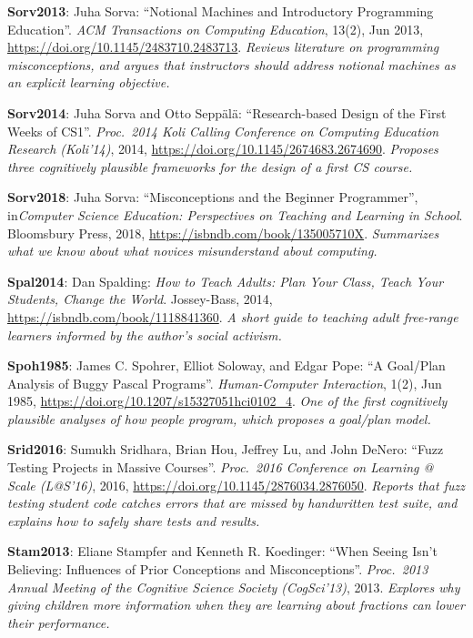 \textbf{\hypertarget{b:Sorv2013}{Sorv2013}\label{b:Sorv2013}}: Juha Sorva: ``Notional Machines and Introductory Programming Education''. \emph{ACM Transactions on Computing Education}, 13(2), Jun 2013, \url{https://doi.org/10.1145/2483710.2483713}. \emph{Reviews literature on programming misconceptions, and argues that instructors should address notional machines as an explicit learning objective.}

\textbf{\hypertarget{b:Sorv2014}{Sorv2014}\label{b:Sorv2014}}: Juha Sorva and Otto Seppälä: ``Research-based Design of the First Weeks of CS1''. \emph{Proc.\ 2014 Koli Calling Conference on Computing Education Research (Koli'14)}, 2014, \url{https://doi.org/10.1145/2674683.2674690}. \emph{Proposes three cognitively plausible frameworks for the design of a first CS course.}

\textbf{\hypertarget{b:Sorv2018}{Sorv2018}\label{b:Sorv2018}}: Juha Sorva: ``Misconceptions and the Beginner Programmer'', in\emph{Computer Science Education: Perspectives on Teaching and Learning in School}. Bloomsbury Press, 2018, \url{https://isbndb.com/book/135005710X}. \emph{Summarizes what we know about what novices misunderstand about computing.}

\textbf{\hypertarget{b:Spal2014}{Spal2014}\label{b:Spal2014}}: Dan Spalding: \emph{How to Teach Adults: Plan Your Class, Teach Your Students, Change the World}. Jossey-Bass, 2014, \url{https://isbndb.com/book/1118841360}. \emph{A short guide to teaching adult free-range learners informed by the author's social activism.}

\textbf{\hypertarget{b:Spoh1985}{Spoh1985}\label{b:Spoh1985}}: James C. Spohrer, Elliot Soloway, and Edgar Pope: ``A Goal/Plan Analysis of Buggy Pascal Programs''. \emph{Human-Computer Interaction}, 1(2), Jun 1985, \url{https://doi.org/10.1207/s15327051hci0102_4}. \emph{One of the first cognitively plausible analyses of how people program, which proposes a goal/plan model.}

\textbf{\hypertarget{b:Srid2016}{Srid2016}\label{b:Srid2016}}: Sumukh Sridhara, Brian Hou, Jeffrey Lu, and John DeNero: ``Fuzz Testing Projects in Massive Courses''. \emph{Proc.\ 2016 Conference on Learning @ Scale (L@S'16)}, 2016, \url{https://doi.org/10.1145/2876034.2876050}. \emph{Reports that fuzz testing student code catches errors that are missed by handwritten test suite, and explains how to safely share tests and results.}

\textbf{\hypertarget{b:Stam2013}{Stam2013}\label{b:Stam2013}}: Eliane Stampfer and Kenneth R. Koedinger: ``When Seeing Isn't Believing: Influences of Prior Conceptions and Misconceptions''. \emph{Proc.\ 2013 Annual Meeting of the Cognitive Science Society (CogSci'13)}, 2013. \emph{Explores why giving children more information when they are learning about fractions can lower their performance.}

